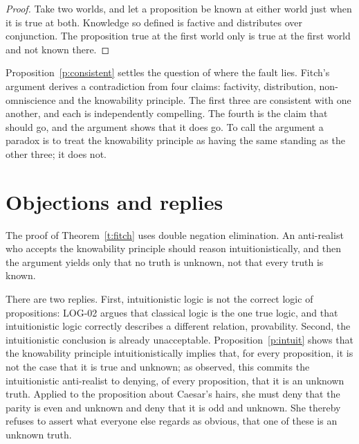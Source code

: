 \documentclass{situationist-preprint}
\begin{document}
\begin{proof}
Take two worlds, and let a proposition be known at either world just when it is true at both. Knowledge so defined is factive and distributes over conjunction. The proposition true at the first world only is true at the first world and not known there.
\end{proof}

Proposition~\ref{p:consistent} settles the question of where the fault lies. Fitch's argument derives a contradiction from four claims: factivity, distribution, non-omniscience and the knowability principle. The first three are consistent with one another, and each is independently compelling. The fourth is the claim that should go, and the argument shows that it does go. To call the argument a paradox is to treat the knowability principle as having the same standing as the other three; it does not.

\section{Objections and replies}

\begin{objection}
The proof of Theorem~\ref{t:fitch} uses double negation elimination. An anti-realist who accepts the knowability principle should reason intuitionistically, and then the argument yields only that no truth is unknown, not that every truth is known.
\end{objection}

\begin{reply}
There are two replies. First, intuitionistic logic is not the correct logic of propositions: LOG-02 argues that classical logic is the one true logic, and that intuitionistic logic correctly describes a different relation, provability. Second, the intuitionistic conclusion is already unacceptable. Proposition~\ref{p:intuit} shows that the knowability principle intuitionistically implies that, for every proposition, it is not the case that it is true and unknown; as \citet{Williamson1982} observed, this commits the intuitionistic anti-realist to denying, of every proposition, that it is an unknown truth. Applied to the proposition about Caesar's hairs, she must deny that the parity is even and unknown and deny that it is odd and unknown. She thereby refuses to assert what everyone else regards as obvious, that one of these is an unknown truth.
\end{reply}
\end{document}
